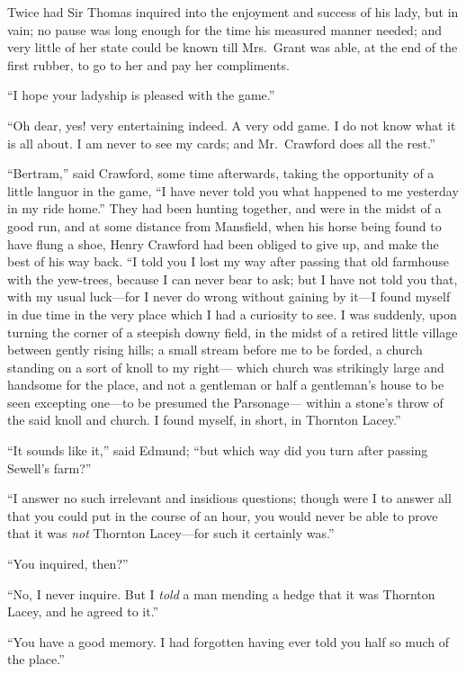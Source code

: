 Twice had Sir Thomas inquired into the enjoyment and
success of his lady, but in vain; no pause was long enough
for the time his measured manner needed; and very little
of her state could be known till Mrs.\ Grant was able,
at the end of the first rubber, to go to her and pay
her compliments.

``I hope your ladyship is pleased with the game.''

``Oh dear, yes! very entertaining indeed.  A very odd game.
I do not know what it is all about.  I am never to see
my cards; and Mr.\ Crawford does all the rest.''

``Bertram,'' said Crawford, some time afterwards, taking the
opportunity of a little languor in the game, ``I have never
told you what happened to me yesterday in my ride home.''
They had been hunting together, and were in the midst of a
good run, and at some distance from Mansfield, when his horse
being found to have flung a shoe, Henry Crawford had been
obliged to give up, and make the best of his way back.
``I told you I lost my way after passing that old farmhouse
with the yew-trees, because I can never bear to ask;
but I have not told you that, with my usual luck---for I
never do wrong without gaining by it---I found myself in due
time in the very place which I had a curiosity to see.
I was suddenly, upon turning the corner of a steepish
downy field, in the midst of a retired little village
between gently rising hills; a small stream before me to
be forded, a church standing on a sort of knoll to my right---%
which church was strikingly large and handsome for
the place, and not a gentleman or half a gentleman's house
to be seen excepting one---to be presumed the Parsonage---%
within a stone's throw of the said knoll and church.
I found myself, in short, in Thornton Lacey.''

``It sounds like it,'' said Edmund; ``but which way did you
turn after passing Sewell's farm?''

``I answer no such irrelevant and insidious questions;
though were I to answer all that you could put in the course
of an hour, you would never be able to prove that it
was \emph{not} Thornton Lacey---for such it certainly was.''

``You inquired, then?''

``No, I never inquire.  But I \emph{told} a man mending a hedge
that it was Thornton Lacey, and he agreed to it.''

``You have a good memory.  I had forgotten having ever
told you half so much of the place.''

